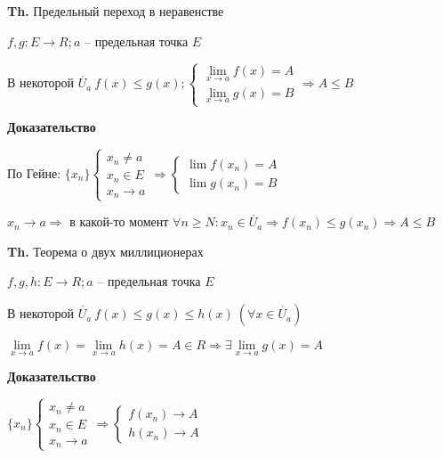 \documentclass[14pt, letter paper]{article}
\begin{document}
\textbf{Th.} Предельный переход в неравенстве

$f, g : E \rightarrow R; a$ -- предельная точка $E$

В некоторой $\mathring{U_a}\ f(x) \leq g(x); \begin{cases}
    \lim\limits_{x \rightarrow a}{f(x)} = A \\
    \lim\limits_{x \rightarrow a}{g(x)} = B
\end{cases} \Rightarrow A \leq B$

\begin{center}
    \textbf{Доказательство}
\end{center}

По Гейне: $\{x_n\} \begin{cases}
    x_n \neq a \\
    x_n \in E \\
    x_n \rightarrow a
\end{cases} \Rightarrow \begin{cases}
    \lim{f(x_n)} = A \\
    \lim{g(x_n)} = B
\end{cases}$

$x_n \rightarrow a \Rightarrow$ в какой-то момент $\forall n \geq N : x_n \in \mathring{U_a} \Rightarrow f(x_n) \leq g(x_n) \Rightarrow A \leq B$

\vspace{5mm}

\textbf{Th.} Теорема о двух миллиционерах

$f, g, h : E \rightarrow R; a$ -- предельная точка $E$

В некоторой $\mathring{U_a}\ f(x) \leq g(x) \leq h(x)\ (\forall x \in \mathring{U_a})$

$\lim\limits_{x \rightarrow a}{f(x)} = \lim\limits_{x \rightarrow a}{h(x)} = A \in R \Rightarrow \exists \lim\limits_{x \rightarrow a}{g(x)} = A$

\begin{center}
    \textbf{Доказательство}
\end{center}

$\{x_n\} \begin{cases}
    x_n \neq a \\
    x_n \in E \\
    x_n \rightarrow a
\end{cases} \Rightarrow \begin{cases}
    f(x_n) \rightarrow A \\
    h(x_n) \rightarrow A
\end{cases}$
\end{document}
